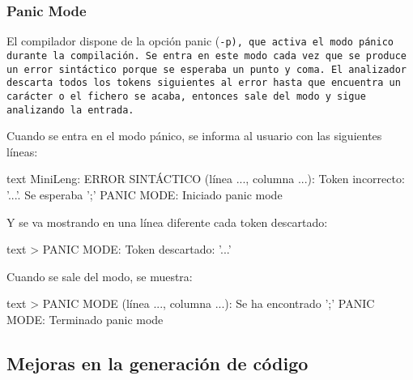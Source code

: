 \documentclass[../main.tex]{subfiles}
\begin{document}
\subsubsection{Panic Mode}
El compilador dispone de la opción panic (\tt{-p}), que activa el modo pánico durante la compilación. Se entra en este modo cada vez que se produce un error sintáctico porque se esperaba un punto y coma. El analizador descarta todos los tokens siguientes al error hasta que encuentra un carácter \car{;} o el fichero se acaba, entonces sale del modo y sigue analizando la entrada.

Cuando se entra en el modo pánico, se informa al usuario con las siguientes líneas:

\begin{codigo}{text}
MiniLeng: ERROR SINTÁCTICO (línea ..., columna ...): Token incorrecto: '...'. Se esperaba ';'
PANIC MODE: Iniciado panic mode
\end{codigo}

Y se va mostrando en una línea diferente cada token descartado:

\begin{codigo}{text}
> PANIC MODE: Token descartado: '...'
\end{codigo}

Cuando se sale del modo, se muestra:

\begin{codigo}{text}
  > PANIC MODE (línea ..., columna ...): Se ha encontrado ';'
PANIC MODE: Terminado panic mode
\end{codigo}

\subsection{Mejoras en la generación de código}
\end{document}
